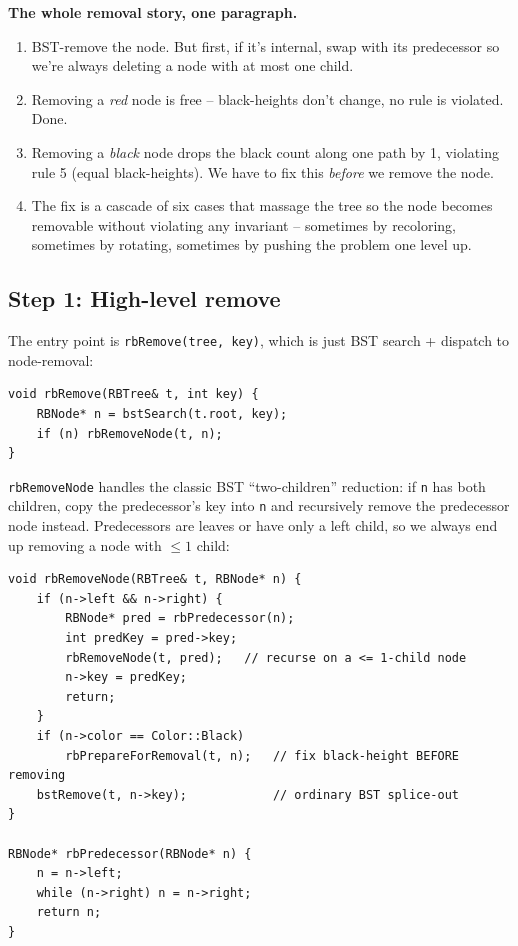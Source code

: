 \documentclass[11pt]{article}
\begin{document}
\begin{ideabox}
\textbf{The whole removal story, one paragraph.}
\begin{enumerate}[leftmargin=*]
    \item BST-remove the node. But first, if it's internal, swap with its predecessor so we're always deleting a node with at most one child.
    \item Removing a \emph{red} node is free -- black-heights don't change, no rule is violated. Done.
    \item Removing a \emph{black} node drops the black count along one path by 1, violating rule 5 (equal black-heights). We have to fix this \emph{before} we remove the node.
    \item The fix is a cascade of six cases that massage the tree so the node becomes removable without violating any invariant -- sometimes by recoloring, sometimes by rotating, sometimes by pushing the problem one level up.
\end{enumerate}
\end{ideabox}

\subsection*{Step 1: High-level remove}

The entry point is \texttt{rbRemove(tree, key)}, which is just BST search + dispatch to node-removal:

\begin{lstlisting}[basicstyle=\ttfamily\small,frame=single]
void rbRemove(RBTree& t, int key) {
    RBNode* n = bstSearch(t.root, key);
    if (n) rbRemoveNode(t, n);
}
\end{lstlisting}

\texttt{rbRemoveNode} handles the classic BST ``two-children'' reduction: if \texttt{n} has both children, copy the predecessor's key into \texttt{n} and recursively remove the predecessor node instead. Predecessors are leaves or have only a left child, so we always end up removing a node with $\leq 1$ child:

\begin{lstlisting}[basicstyle=\ttfamily\small,frame=single]
void rbRemoveNode(RBTree& t, RBNode* n) {
    if (n->left && n->right) {
        RBNode* pred = rbPredecessor(n);
        int predKey = pred->key;
        rbRemoveNode(t, pred);   // recurse on a <= 1-child node
        n->key = predKey;
        return;
    }
    if (n->color == Color::Black)
        rbPrepareForRemoval(t, n);   // fix black-height BEFORE removing
    bstRemove(t, n->key);            // ordinary BST splice-out
}

RBNode* rbPredecessor(RBNode* n) {
    n = n->left;
    while (n->right) n = n->right;
    return n;
}
\end{lstlisting}
\end{document}
